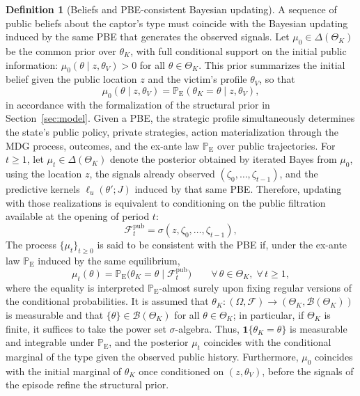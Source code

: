 \documentclass[review,authoryear,12pt]{elsarticle}
\theoremstyle{plain}
\theoremstyle{definition}
\newtheorem{definition}[theorem]{Definition}
\newcommand{\ProbE}{\mathbb{P}_{\mathrm{E}}}
\newcommand{\ThetaK}{\Theta_K}
\newcommand{\1}{\mathbf{1}}
\begin{document}
\begin{definition}[Beliefs and PBE-consistent Bayesian updating]\label{def:beliefs-martingale}
A sequence of public beliefs about the captor's type must coincide with the Bayesian updating induced by the same PBE that generates the observed signals. Let $\mu_0\in\Delta(\ThetaK)$ be the common prior over $\theta_K$, with full conditional support on the initial public information: $\mu_0(\theta \mid z,\theta_V)>0$ for all $\theta\in\ThetaK$. This prior summarizes the initial belief given the public location $z$ and the victim's profile $\theta_V$, so that
\[
\mu_0(\theta \mid z,\theta_V)=\ProbE(\theta_K=\theta\mid z,\theta_V),
\]
in accordance with the formalization of the structural prior in Section~\ref{sec:model}. Given a PBE, the strategic profile simultaneously determines the state's public policy, private strategies, action materialization through the MDG process, outcomes, and the ex-ante law $\ProbE$ over public trajectories. For $t\ge 1$, let $\mu_t\in\Delta(\ThetaK)$ denote the posterior obtained by iterated Bayes from $\mu_0$, using the location $z$, the signals already observed $(\zeta_0,\ldots,\zeta_{t-1})$, and the predictive kernels $\ell_u(\theta';J)$ induced by that same PBE. Therefore, updating with those realizations is equivalent to conditioning on the public filtration available at the opening of period $t$:
\[
\mathcal{F}_t^{\mathrm{pub}}=\sigma(z,\zeta_0,\ldots,\zeta_{t-1}),
\]
The process $\{\mu_t\}_{t\ge 0}$ is said to be consistent with the PBE if, under the ex-ante law $\ProbE$ induced by the same equilibrium,
\begin{equation}
\label{eq:beliefs-ebp-consistency}
\mu_t(\theta)=\ProbE\bigl(\theta_K=\theta\mid\mathcal{F}_t^{\mathrm{pub}}\bigr)\qquad \forall\,\theta\in\ThetaK,\;\forall\,t\ge 1,
\end{equation}
where the equality is interpreted $\ProbE$-almost surely upon fixing regular versions of the conditional probabilities. It is assumed that $\theta_K:(\Omega,\mathcal{F})\to(\ThetaK,\mathcal{B}(\ThetaK))$ is measurable and that $\{\theta\}\in\mathcal{B}(\ThetaK)$ for all $\theta\in\ThetaK$; in particular, if $\ThetaK$ is finite, it suffices to take the power set $\sigma$-algebra. Thus, $\mathbf{1}\{\theta_K=\theta\}$ is measurable and integrable under $\ProbE$, and the posterior $\mu_t$ coincides with the conditional marginal of the type given the observed public history. Furthermore, $\mu_0$ coincides with the initial marginal of $\theta_K$ once conditioned on $(z, \theta_V)$, before the signals of the episode refine the structural prior.
\end{definition}
\end{document}
